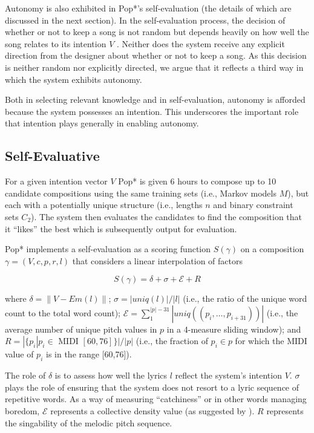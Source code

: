 \documentclass[phd,electronic,oneside,twosidetoc,letterpaper,chaptercenter,parttop,lof,lot]{byumsphd}
\begin{document}
Autonomy is also exhibited in Pop*'s self-evaluation (the details of which are discussed in the next section). In the self-evaluation process, the decision of whether or not to keep a song is not random but depends heavily on how well the song relates to its intention $V$%
. Neither does the system receive any explicit direction from the designer about whether or not to keep a song. As this decision is neither random nor explicitly directed, we argue that it reflects a third way in which the system exhibits autonomy.

Both in selecting relevant knowledge and in self-evaluation, autonomy is afforded because the system possesses an intention. This underscores the important role that intention plays generally in enabling autonomy.

\subsection{Self-Evaluative}

For a given intention vector $V$ Pop* is given 6 hours to compose up to 10 candidate compositions using the same training sets (i.e., Markov models $M$), but each with a potentially unique structure (i.e., lengths $n$ and binary constraint sets $C_2$). The system then evaluates the candidates to find the composition that it ``likes'' the best which is subsequently output for evaluation.

Pop* implements a self-evaluation as a scoring function $S(\gamma)$ on a composition $\gamma=(V,c,p,r,l)$ that considers a linear interpolation of factors

\[
S(\gamma) = \delta + \sigma + {\mathcal{E}} + R
\]

\noindent where $\delta=\lVert V - Em(l)\rVert$; $\sigma=|uniq(l)|/|l|$ (i.e., the ratio of the unique word count to the total word count); ${\mathcal{E}}=\sum_1^{|p|-31} |uniq((p_i,\dots,p_{i+31}))|$ (i.e., the average number of unique pitch values in $p$ in a 4-measure sliding window); and $R = |\{p_i| p_i \in$ MIDI $[60,76]\}|/|p|$ (i.e., the fraction of $p_i\in p$ for which the MIDI value of $p_i$ is in the range [60,76]).

The role of $\delta$ is to assess how well the lyrics $l$ reflect the system's intention $V$. $\sigma$ plays the role of ensuring that the system does not resort to a lyric sequence of repetitive words. As a way of measuring ``catchiness'' or in other words managing boredom, ${\mathcal{E}}$ represents a collective density value (as suggested by \citeauthor{eigenfeldt2017distributed} \cite{eigenfeldt2017distributed}). $R$ represents the singability of the melodic pitch sequence.
 
\end{document}
